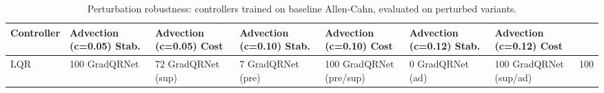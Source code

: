 \begin{table}
\caption{Perturbation robustness: controllers trained on baseline Allen-Cahn, evaluated on perturbed variants.}
\label{tab:ac-robustness}
\begin{tabular}{lllllll}
\toprule
Controller & Advection (c=0.05) Stab. & Advection (c=0.05) Cost & Advection (c=0.10) Stab. & Advection (c=0.10) Cost & Advection (c=0.12) Stab. & Advection (c=0.12) Cost \\
\midrule
LQR & 100%
GradQRNet & 72%
GradQRNet (sup) & 7%
GradQRNet (pre) & 100%
GradQRNet (pre/sup) & 0%
GradQRNet (ad) & 100%
GradQRNet (sup/ad) & 100%
\bottomrule
\end{tabular}
\end{table}

